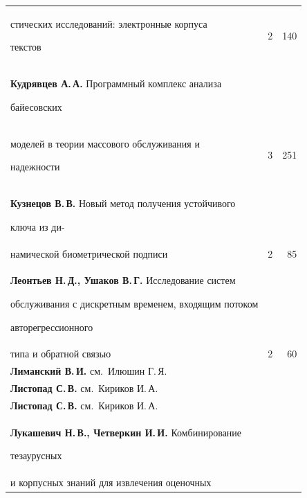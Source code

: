 {\begin{tabular}{p{317.5pt}rr}
\hspace*{21pt}стических исследований: электронные корпуса


текстов&2&140\\[1pt]


\textbf{Кудрявцев А.\,А.} Программный комплекс анализа


байесовских\linebreak


\\[-12pt]


\hspace*{21pt}моделей в теории массового обслуживания и


надежности&3&251\\[1pt]


\textbf{Кузнецов В.\,В.} Новый метод получения устойчивого


ключа из ди-\linebreak


\\[-12pt]


\hspace*{21pt}намической биометрической подписи&2&85\\[1pt]


\hangindent=21pt\noindent\textbf{Леонтьев Н.\,Д., Ушаков В.\,Г.} Исследование систем


обслуживания с дискретным временем, входящим потоком


авторегрессионного\linebreak


\\[-12pt]


\hspace*{21pt}типа и обратной связью&2&60\\[1pt]


\textbf{Лиманский В.\,И.} см.\ Илюшин Г.\,Я.&&\\[1pt]


\textbf{Листопад С.\,В.} см.\ Кириков И.\,А.&&\\[1pt]


\textbf{Листопад С.\,В.} см.\ Кириков И.\,А.&&\\[1pt]


\textbf{Лукашевич Н.\,В., Четверкин И.\,И.} Комбинирование


тезаурусных\linebreak


\\[-12pt]


\hspace*{21pt}и корпусных знаний для извлечения оценочных



\end{tabular}}
